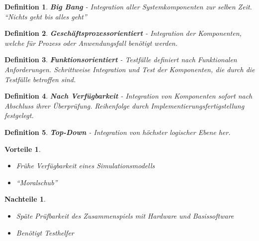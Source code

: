 \documentclass[a4paper]{article}
\theoremstyle{break}
\newtheorem{defi}{Definition}[section]
\newtheorem{why}{Vorteile}[section]
\newtheorem{whynot}{Nachteile}[section]
\begin{document}
          \begin{defi}
            \textbf{Big Bang} - Integration aller Systemkomponenten zur selben Zeit. \newline
            ``Nichts geht bis alles geht''
          \end{defi}

          \begin{defi}
            \textbf{Geschäftsprozessorientiert} - Integration der Komponenten, welche für Prozess oder Anwendungsfall benötigt werden.
          \end{defi}

          \begin{defi}
            \textbf{Funktionsorientiert} - Testfälle definiert nach Funktionalen Anforderungen. Schrittweise Integration und Test der Komponenten, die durch die Testfälle betroffen sind.
          \end{defi}

          \begin{defi}
            \textbf{Nach Verfügbarkeit} - Integration von Komponenten sofort nach Abschluss ihrer Überprüfung. Reihenfolge durch Implementierungsfertigstellung festgelegt.
          \end{defi}

          \begin{defi}
            \textbf{Top-Down} - Integration von höchster logischer Ebene her.
          \end{defi}
          \begin{why}
            \begin{itemize}
            \item Frühe Verfügbarkeit eines Simulationsmodells
            \item ``Moralschub''
            \end{itemize}
          \end{why}
          \begin{whynot}
            \begin{itemize}
            \item Späte Prüfbarkeit des Zusammenspiels mit Hardware und Basissoftware
            \item Benötigt Testhelfer
            \end{itemize}
          \end{whynot}
          
\end{document}
